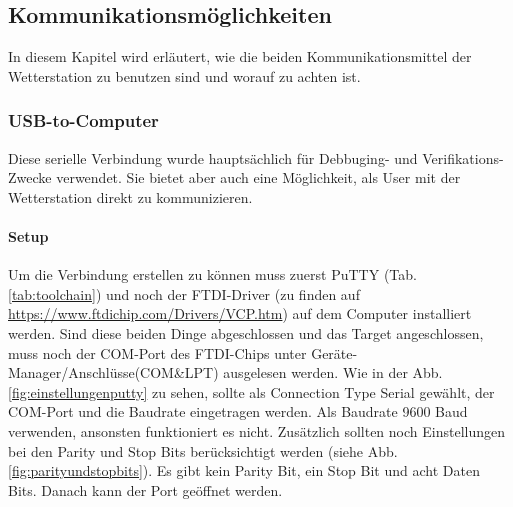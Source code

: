\subsection{Kommunikationsmöglichkeiten}
\label{subsec:manual}
In diesem Kapitel wird erläutert, wie die beiden Kommunikationsmittel der Wetterstation zu benutzen sind und worauf zu achten ist.\\

\subsubsection{USB-to-Computer}
\label{subsubsec:usbtocomputer}
Diese serielle Verbindung wurde hauptsächlich für Debbuging- und Verifikations-Zwecke verwendet. Sie bietet aber auch eine Möglichkeit, als User mit der Wetterstation direkt zu kommunizieren.

\paragraph{Setup}
\label{para:puttysetup}
Um die Verbindung erstellen zu können muss zuerst PuTTY (Tab. \ref{tab:toolchain}) und noch der FTDI-Driver (zu finden auf \url{https://www.ftdichip.com/Drivers/VCP.htm}) auf dem Computer installiert werden. Sind diese beiden Dinge abgeschlossen und das Target angeschlossen, muss noch der COM-Port des FTDI-Chips unter Geräte-Manager/Anschlüsse(COM\&LPT) ausgelesen werden. Wie in der Abb. \ref{fig:einstellungenputty} zu sehen, sollte als Connection Type Serial gewählt, der COM-Port und die Baudrate eingetragen werden. Als Baudrate 9600 Baud verwenden, ansonsten funktioniert es nicht. Zusätzlich sollten noch Einstellungen bei den Parity und Stop Bits berücksichtigt werden (siehe Abb. \ref{fig:parityundstopbits}). Es gibt kein Parity Bit, ein Stop Bit und acht Daten Bits. Danach kann der Port geöffnet werden.\\

